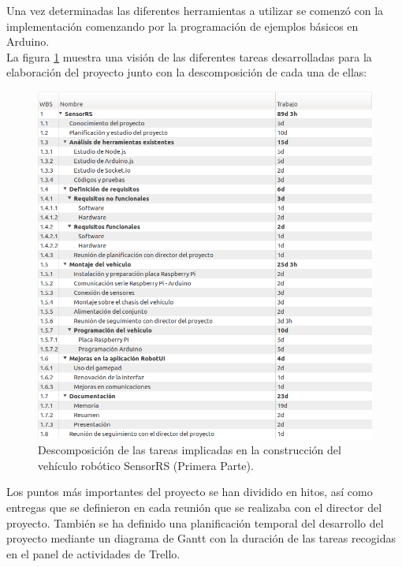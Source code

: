 Una vez determinadas las diferentes herramientas a utilizar se comenzó con la implementación comenzando por la programación de ejemplos básicos en Arduino.\\

La figura \ref{gantt:tareas01} muestra una visión de las diferentes tareas desarrolladas para la elaboración del proyecto junto con la descomposición de cada una de ellas:\\

\begin{figure}
  \begin{center}
    \includegraphics[scale=0.6]{imagenes/planificacion/descomposicion_tareas01.png}
  \end{center}
  \caption{Descomposición de las tareas implicadas en la construcción del vehículo robótico SensorRS (Primera Parte).}
  \label{gantt:tareas01}
\end{figure}

Los puntos más importantes del proyecto se han dividido en hitos, así como entregas que se definieron en cada reunión que se realizaba con el director del proyecto. 
También se ha definido una planificación temporal del desarrollo del proyecto mediante un diagrama de Gantt con la duración de las tareas recogidas en el panel de actividades de Trello.\\
\newpage

